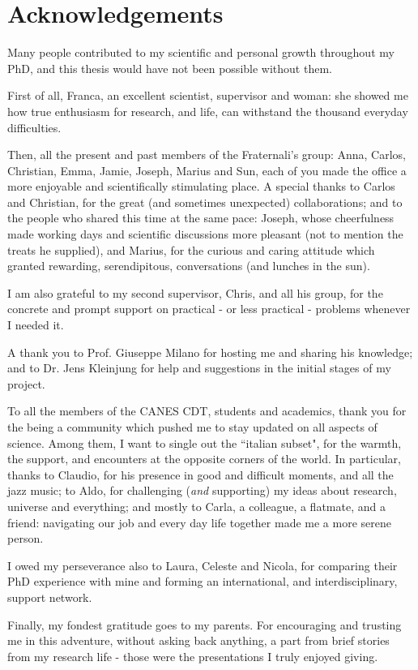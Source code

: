 %
%


\thispagestyle{empty}
\chapter*{Acknowledgements}
%
\begin{onehalfspacing}
Many people contributed to my scientific and personal growth throughout my PhD, and this thesis would have not been possible without them.

First of all, Franca, an excellent scientist, supervisor and woman: she showed me how true enthusiasm for research, and life, can withstand the thousand everyday difficulties.

Then, all the present and past members of the Fraternali's group: Anna, Carlos, Christian, Emma, Jamie, Joseph, Marius and Sun, each of you made the office a more enjoyable and scientifically stimulating place. A special thanks to Carlos and Christian, for the great (and sometimes unexpected) collaborations; and to the people who shared this time at the same pace: Joseph, whose cheerfulness made working days and scientific discussions more pleasant (not to mention the treats he supplied), and Marius, for the curious and caring attitude which granted rewarding, serendipitous, conversations (and lunches in the sun).

I am also grateful to my second supervisor, Chris, and all his group, for the concrete and prompt support on practical - or less practical - problems whenever I needed it.

A thank you to Prof. Giuseppe Milano for hosting me and sharing his knowledge; and to Dr. Jens Kleinjung for help and suggestions in the initial stages of my project.

To all the members of the CANES CDT, students and academics, thank you for the being a  community which pushed me to stay updated on all aspects of science. Among them, I want to single out the ``italian subset", for the warmth, the support, and encounters at the opposite corners of the world. In particular, thanks to Claudio, for his presence in good and difficult moments, and all the jazz music; to Aldo, for challenging (\emph{and} supporting) my ideas about research, universe and everything; and mostly to Carla, a colleague, a flatmate, and a friend: navigating our job and every day life together made me a more serene person.

I owed my perseverance also to Laura, Celeste and Nicola, for comparing their PhD experience with mine and forming an international, and interdisciplinary, support network.

Finally, my fondest gratitude goes to my parents. For encouraging and trusting me in this adventure, without asking back anything, a part from brief stories from my research life - those were the presentations I truly enjoyed giving.

\end{onehalfspacing}



